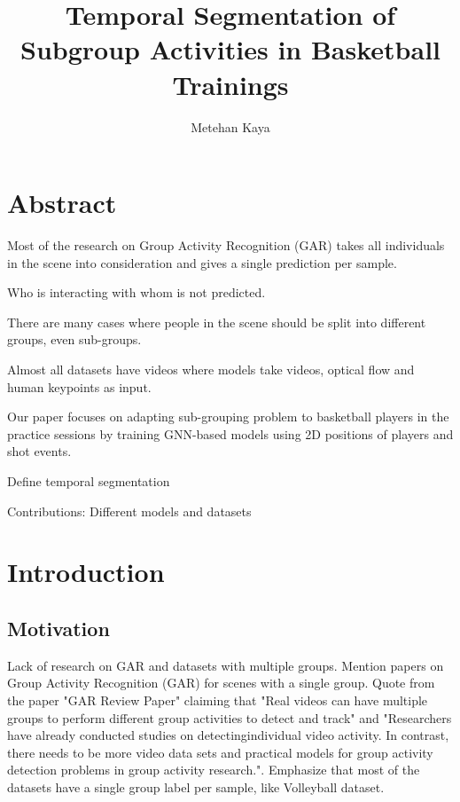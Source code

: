 \documentclass[doctype=mastersthesis,lang=english,BCOR=15mm,biblatex]{ldvbook}
\begin{document}
\title{Temporal Segmentation of Subgroup Activities in Basketball Trainings}
\author{Metehan Kaya}
\maketitle[frontcover=Design1]


\chapter*{Abstract}

Most of the research on Group Activity Recognition (GAR) takes all individuals in the scene into consideration and gives a single prediction per sample.

Who is interacting with whom is not predicted.

There are many cases where people in the scene should be split into different groups, even sub-groups.

Almost all datasets have videos where models take videos, optical flow and human keypoints as input.

Our paper focuses on adapting sub-grouping problem to basketball players in the practice sessions by training GNN-based models using 2D positions of players and shot events.

Define temporal segmentation

Contributions: Different models and datasets

\tableofcontents

\chapter{Introduction}


\section{Motivation}

Lack of research on GAR and datasets with multiple groups. Mention papers on Group Activity Recognition (GAR) for scenes with a single group. Quote from the paper "GAR Review Paper" claiming that "Real videos can have multiple groups to perform different group activities to detect and track" and "Researchers have already conducted studies on detectingindividual video activity. In contrast, there needs to be more video data sets and practical models for group activity detection problems in group activity research.". Emphasize that most of the datasets have a single group label per sample, like Volleyball dataset.
\end{document}
